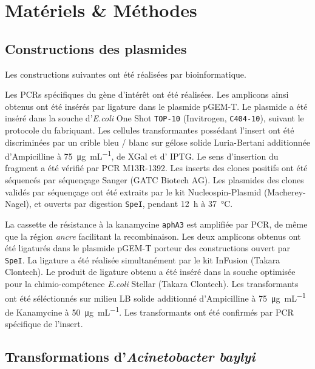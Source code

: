 \section{Matériels \& Méthodes}
\label{sec:materiel}

\subsection{Constructions des plasmides}
\label{subsec:constructions}

Les constructions suivantes ont été réalisées par bioinformatique.

Les PCRs spécifiques du gène d'intérêt ont été réalisées. Les amplicons ainsi
obtenus ont été insérés par ligature dans le plasmide pGEM-T. Le plasmide a été
inséré dans la souche d'\textit{E.coli} One Shot\textsuperscript{{\textregistered}}
\texttt{TOP-10} (Invitrogen, \texttt{C404-10}), suivant le protocole du
fabriquant. Les cellules transformantes possédant l'insert ont été discriminées
par un crible bleu / blanc sur gélose solide Luria-Bertani additionnée
d'Ampicilline à \SI{75}{\ug\per\mL}, de XGal et d' IPTG. Le sens d'insertion du
fragment a été vérifié par PCR M13R-1392. Les inserts des clones positifs ont
été séquencés par séquençage Sanger (GATC Biotech AG). Les plasmides des clones
validés par séquençage ont été extraits par le kit Nucleospin-Plasmid
(Macherey-Nagel), et ouverts par digestion \texttt{SpeI}, pendant \si{12\hour} à
\si{37\celsius}.

La cassette de résistance à la kanamycine \texttt{aphA3} est amplifiée par PCR,
de même que la région \emph{ancre} facilitant la recombinaison. Les deux
amplicons obtenus ont été ligaturés dans le plasmide pGEM-T porteur des
constructions ouvert par \texttt{SpeI}. La ligature a été réalisée simultanément
par le kit InFusion (Takara Clontech). Le produit de ligature obtenu a été
inséré dans la souche optimisée pour la chimio-compétence \emph{E.coli} Stellar
(Takara Clontech). Les transformants ont été séléctionnés sur milieu LB solide
additionné d'Ampicilline à \SI{75}{\ug\per\mL} de Kanamycine à
\SI{50}{\ug\per\mL}. Les transformants ont été confirmés par PCR spécifique de
l'insert.

\subsection{Transformations d'\emph{Acinetobacter baylyi}}
\label{subsec:transfo}

